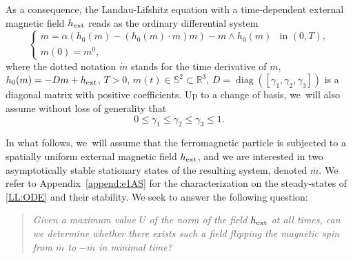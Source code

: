 \documentclass[10pt]{amsart}
\theoremstyle{definition}
\newcommand{\R} {\mathbb{R}}
\begin{document}
As a consequence, the Landau-Lifshitz equation with a time-dependent external magnetic field $h_{\rm ext}$ reads as the ordinary differential system
\begin{equation}\label{LL:ODE}
\begin{cases}
\dot{m} = \alpha \left(h_0(m)-(h_0(m)\cdot m) m\right)-m\wedge h_0(m) & \text{in }(0,T), \\
m(0) =m^0,
\end{cases}
\end{equation}
where the dotted notation $\dot{m}$ stands for the time derivative of $m$, $h_0(m)=-Dm+h_{\rm ext}$, $T>0$, $m(t)\in\mathbb{S}^2\subset\R^3$, $D=\operatorname{diag}([\gamma_1,\gamma_2,\gamma_3])$ is a diagonal matrix with positive coefficients.
Up to a change of basis, we~will also assume without loss of generality that
\begin{equation}\label{hyp:alpha}
0\leq \gamma_1\leq \gamma_2\leq\gamma_3\leq 1.
\end{equation}

In what follows, we~will assume that the ferromagnetic particle is subjected to a spatially uniform external magnetic field $h_{\rm ext}$, and we are interested in two asymptotically stable stationary states of the resulting system, denoted $\overline{m}$. {We refer to Appendix~\ref{append:e1AS} for the characterization on the steady-states of \eqref{LL:ODE} and their stability.}
We seek to answer the following question:
\begin{quote}
\textit{Given a maximum value $U $ of the norm of the field $h_{\rm ext}$ at all times, can we determine whether there exists such a field flipping the magnetic spin from $\overline{m}$ to $-\overline{m}$ in minimal time?}
\end{quote}
\end{document}
